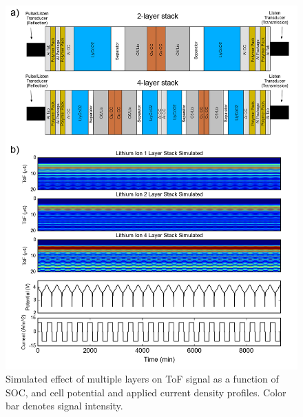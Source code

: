 \begin{figure}[htb]
  \centering
    \includegraphics[width=\textwidth]{ch4-bw/images/multistack.png}
    \caption[Simulated effect of multiple layers on ToF signal.]{Simulated effect of multiple layers on ToF signal as a function of SOC, and cell potential and applied current density profiles. Color bar denotes signal intensity.}
    \label{fig:multistack}
\end{figure}

\clearpage

